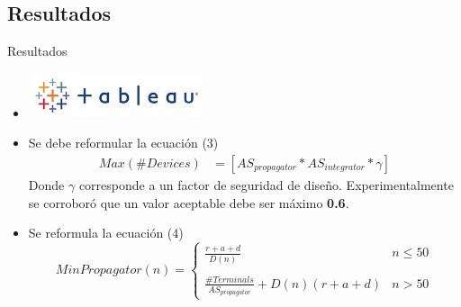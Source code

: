 \subsection{Resultados}
\begin{frame}{Resultados}{}
    \begin{itemize}
    \justifying
    \item<1-|alert@1> \centering \includegraphics[width=0.4\textwidth,height=0.3\textheight,keepaspectratio]{Figures/Tableau.JPG}
    \item<2-|alert@2> Se debe reformular la ecuación (3) \begin{align} Max(\# Devices) &= \left[ AS_{propagator}*AS_{integrator}* \gamma \right ]  \label{eqn7}
\end{align} Donde $\gamma$ corresponde a un factor de seguridad de diseño. Experimentalmente se corroboró que un valor aceptable debe ser máximo \textbf{0.6}.
    \item<3-|alert@3> Se reformula la ecuación (4) \begin{equation}
    Min Propagator(n)=\left\{ \begin{array}{ccc}
            \frac{r+a+d}{D(n)} & n \leq 50 \\
            \\
            \frac{\# Terminals}{AS_{propagator}} + D(n)(r+a+d) & n > 50 
             \end{array}
   \right. \label{eqn8}
    \end{equation}  
  \end{itemize}
\end{frame}
